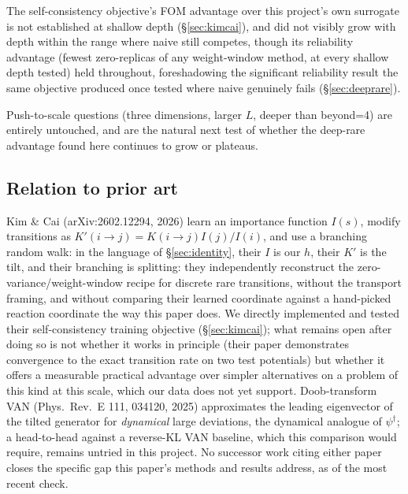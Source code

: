 \documentclass[a4paper,fleqn]{cas-sc}
\newcommand{\dg}{^{\dagger}}
\begin{document}
The self-consistency objective's FOM advantage over this project's own surrogate is
	not established at shallow depth (\S\ref{sec:kimcai}), and did not visibly grow with
depth within the range where naive still competes, though its reliability advantage
(fewest zero-replicas of any weight-window method, at every shallow depth tested) held
throughout, foreshadowing the significant reliability result the same objective produced
once tested where naive genuinely fails (\S\ref{sec:deeprare}).

Push-to-scale questions (three dimensions, larger $L$, deeper than beyond=4)
	are entirely untouched, and are the natural next test of whether the deep-rare
advantage found here continues to grow or plateaus.

\subsection{Relation to prior art}\label{sec:pos}
Kim \& Cai (arXiv:2602.12294, 2026) learn an importance function $I(s)$, modify
transitions as $K'(i\to j)=K(i\to j)I(j)/I(i)$, and use a branching random walk: in the
language of \S\ref{sec:identity}, their $I$ is our $h$, their $K'$ is the tilt, and their
branching is splitting: they independently reconstruct the zero-variance/weight-window
recipe for discrete rare transitions, without the transport framing, and without comparing
their learned coordinate against a hand-picked reaction coordinate the way this paper does.
We directly implemented and tested their self-consistency training objective
(\S\ref{sec:kimcai}); what remains open after doing so is not whether it works in
principle (their paper demonstrates convergence to the exact transition rate on two test
potentials) but whether it offers a measurable practical advantage over simpler
alternatives on a problem of this kind at this scale, which our data does not yet support.
Doob-transform VAN (Phys.\ Rev.\ E 111, 034120, 2025) approximates the
leading eigenvector of the tilted generator for \emph{dynamical} large deviations, the
dynamical analogue of $\psi\dg$; a head-to-head against a reverse-KL VAN baseline, which
this comparison would require, remains untried in this project. No successor work citing
either paper closes the specific gap this paper's methods and results address, as of the
most recent check.

\FloatBarrier

\end{document}
